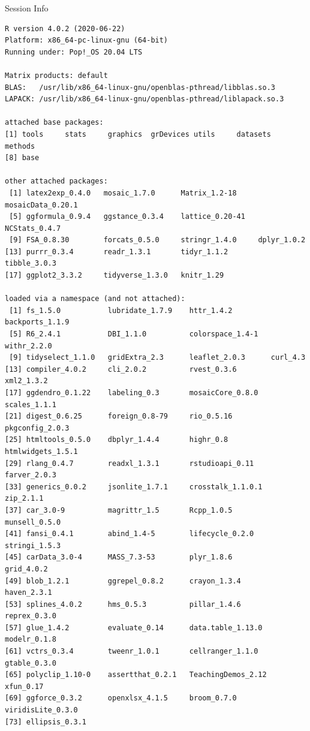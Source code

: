 \documentclass[10pt,handout]{beamer}\usepackage[]{graphicx}\usepackage[]{color}
\makeatletter
\newenvironment{kframe}{%
 \def\at@end@of@kframe{}%
 \ifinner\ifhmode%
  \def\at@end@of@kframe{\end{minipage}}%
  \begin{minipage}{\columnwidth}%
 \fi\fi%
 \def\FrameCommand##1{\hskip\@totalleftmargin \hskip-\fboxsep
 \colorbox{shadecolor}{##1}\hskip-\fboxsep
     \hskip-\linewidth \hskip-\@totalleftmargin \hskip\columnwidth}%
 \MakeFramed {\advance\hsize-\width
   \@totalleftmargin\z@ \linewidth\hsize
   \@setminipage}}%
 {\par\unskip\endMakeFramed%
 \at@end@of@kframe}
\newenvironment{knitrout}{}{} %
\makeatother
\begin{document}
\begin{frame}[fragile]{Session Info}
	\tiny
	
\begin{knitrout}\tiny
{}\color{fgcolor}\begin{kframe}
\begin{verbatim}
R version 4.0.2 (2020-06-22)
Platform: x86_64-pc-linux-gnu (64-bit)
Running under: Pop!_OS 20.04 LTS

Matrix products: default
BLAS:   /usr/lib/x86_64-linux-gnu/openblas-pthread/libblas.so.3
LAPACK: /usr/lib/x86_64-linux-gnu/openblas-pthread/liblapack.so.3

attached base packages:
[1] tools     stats     graphics  grDevices utils     datasets  methods  
[8] base     

other attached packages:
 [1] latex2exp_0.4.0   mosaic_1.7.0      Matrix_1.2-18     mosaicData_0.20.1
 [5] ggformula_0.9.4   ggstance_0.3.4    lattice_0.20-41   NCStats_0.4.7    
 [9] FSA_0.8.30        forcats_0.5.0     stringr_1.4.0     dplyr_1.0.2      
[13] purrr_0.3.4       readr_1.3.1       tidyr_1.1.2       tibble_3.0.3     
[17] ggplot2_3.3.2     tidyverse_1.3.0   knitr_1.29       

loaded via a namespace (and not attached):
 [1] fs_1.5.0           lubridate_1.7.9    httr_1.4.2         backports_1.1.9   
 [5] R6_2.4.1           DBI_1.1.0          colorspace_1.4-1   withr_2.2.0       
 [9] tidyselect_1.1.0   gridExtra_2.3      leaflet_2.0.3      curl_4.3          
[13] compiler_4.0.2     cli_2.0.2          rvest_0.3.6        xml2_1.3.2        
[17] ggdendro_0.1.22    labeling_0.3       mosaicCore_0.8.0   scales_1.1.1      
[21] digest_0.6.25      foreign_0.8-79     rio_0.5.16         pkgconfig_2.0.3   
[25] htmltools_0.5.0    dbplyr_1.4.4       highr_0.8          htmlwidgets_1.5.1 
[29] rlang_0.4.7        readxl_1.3.1       rstudioapi_0.11    farver_2.0.3      
[33] generics_0.0.2     jsonlite_1.7.1     crosstalk_1.1.0.1  zip_2.1.1         
[37] car_3.0-9          magrittr_1.5       Rcpp_1.0.5         munsell_0.5.0     
[41] fansi_0.4.1        abind_1.4-5        lifecycle_0.2.0    stringi_1.5.3     
[45] carData_3.0-4      MASS_7.3-53        plyr_1.8.6         grid_4.0.2        
[49] blob_1.2.1         ggrepel_0.8.2      crayon_1.3.4       haven_2.3.1       
[53] splines_4.0.2      hms_0.5.3          pillar_1.4.6       reprex_0.3.0      
[57] glue_1.4.2         evaluate_0.14      data.table_1.13.0  modelr_0.1.8      
[61] vctrs_0.3.4        tweenr_1.0.1       cellranger_1.1.0   gtable_0.3.0      
[65] polyclip_1.10-0    assertthat_0.2.1   TeachingDemos_2.12 xfun_0.17         
[69] ggforce_0.3.2      openxlsx_4.1.5     broom_0.7.0        viridisLite_0.3.0 
[73] ellipsis_0.3.1    
\end{verbatim}
\end{kframe}
\end{knitrout}
	
\end{frame}
\end{document}
